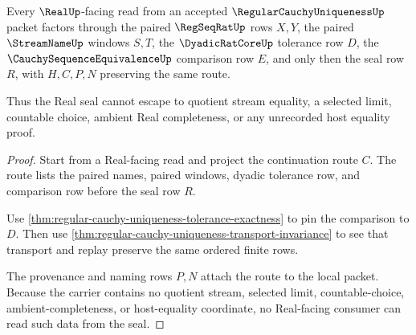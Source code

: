 \begin{theorem}
\label{thm:regular-cauchy-uniqueness-real-seal-nonescape}
Every $\RealUp$-facing read from an accepted $\RegularCauchyUniquenessUp$ packet factors through the paired $\RegSeqRatUp$ rows $X,Y$, the paired $\StreamNameUp$ windows $S,T$, the $\DyadicRatCoreUp$ tolerance row $D$, the $\CauchySequenceEquivalenceUp$ comparison row $E$, and only then the seal row $R$, with $H,C,P,N$ preserving the same route.

Thus the Real seal cannot escape to quotient stream equality, a selected limit, countable choice, ambient Real completeness, or any unrecorded host equality proof.
\end{theorem}
\begin{proof}
Start from a Real-facing read and project the continuation route $C$. The route lists the paired names, paired windows, dyadic tolerance row, and comparison row before the seal row $R$.

Use \autoref{thm:regular-cauchy-uniqueness-tolerance-exactness} to pin the comparison to $D$. Then use \autoref{thm:regular-cauchy-uniqueness-transport-invariance} to see that transport and replay preserve the same ordered finite rows.

The provenance and naming rows $P,N$ attach the route to the local packet. Because the carrier contains no quotient stream, selected limit, countable-choice, ambient-completeness, or host-equality coordinate, no Real-facing consumer can read such data from the seal.
\end{proof}


\begin{closurestatus}{\RegularCauchyUniquenessUp}
  \theoryclosure{\seedClosure}
  \formalstatus{\unformalizedV}
\end{closurestatus}
